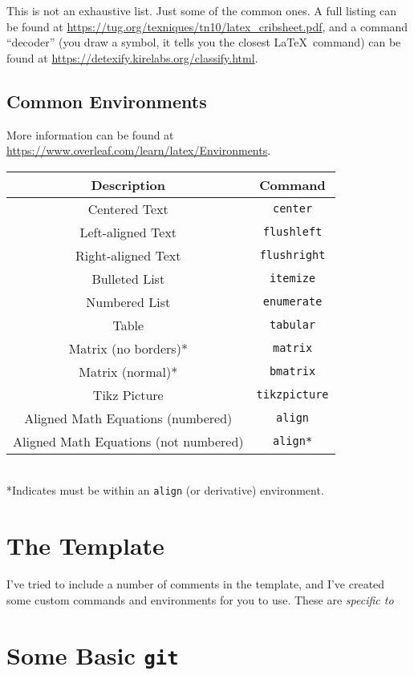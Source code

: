 \documentclass[a4paper,10pt]{article}
\begin{document}
\noindent This is not an exhaustive list. Just some of the common ones. A full listing can be found at \url{https://tug.org/texniques/tn10/latex_cribsheet.pdf}, and a command ``decoder'' (you draw a symbol, it tells you the closest \LaTeX\ command) can be found at \url{https://detexify.kirelabs.org/classify.html}.

\subsection{Common Environments}

More information can be found at \url{https://www.overleaf.com/learn/latex/Environments}.

\begin{center}
	\begin{tabular}{|c|c|} \hline
		\textbf{Description} & \textbf{Command} \\\hline
		Centered Text & \texttt{center} \\
		Left-aligned Text & \texttt{flushleft} \\
		Right-aligned Text & \texttt{flushright} \\
		Bulleted List & \texttt{itemize} \\
		Numbered List & \texttt{enumerate} \\
		Table & \texttt{tabular} \\
		Matrix (no borders)* & \texttt{matrix} \\
		Matrix (normal)* & \texttt{bmatrix} \\
		Tikz Picture & \texttt{tikzpicture} \\
		Aligned Math Equations (numbered) & \texttt{align} \\
		Aligned Math Equations (not numbered) & \texttt{align*} \\ \hline
	\end{tabular} \\
	*Indicates must be within an \texttt{align} (or derivative) environment.
\end{center}



\section{The Template}
I've tried to include a number of comments in the template, and I've created some custom commands and environments for you to use. These are \emph{specific to }

\section{Some Basic \texttt{git}}
\end{document}
